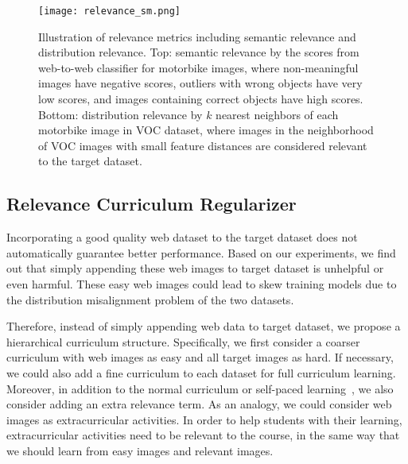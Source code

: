 \documentclass[10pt,twocolumn,letterpaper]{article}
\begin{document}
\begin{figure}
\texttt{[image: relevance\_sm.png]}
\caption{Illustration of relevance metrics including semantic relevance and distribution relevance. Top: semantic relevance by the scores from web-to-web classifier for motorbike images, where non-meaningful images have negative scores, outliers with wrong objects have very low scores, and images containing correct objects have high scores.
Bottom: distribution relevance by $k$ nearest neighbors of each motorbike image in VOC dataset, where images in the neighborhood of VOC images with small feature distances are considered relevant to the target dataset.}
\label{fig:relevance}
\end{figure}


\subsection {Relevance Curriculum Regularizer}




Incorporating a good quality web dataset to the target dataset does not automatically guarantee better performance. Based on our experiments, we find out that simply appending these web images to target dataset is unhelpful or even harmful. These easy web images could lead to skew training models due to the distribution misalignment problem of the two datasets.




Therefore, instead of simply appending web data to target dataset, we propose a hierarchical curriculum structure. Specifically, we first consider a coarser curriculum with web images as easy and all target images as hard. If necessary, we could also add a fine curriculum to each dataset for full curriculum learning. Moreover, in addition to the normal curriculum or self-paced learning~\cite{jiang2015self}, we also consider adding an extra relevance term. As an analogy, we could consider web images as extracurricular activities. In order to help students with their learning, extracurricular activities need to be relevant to the course, in the same way that we should learn from easy images and relevant images.
\end{document}
